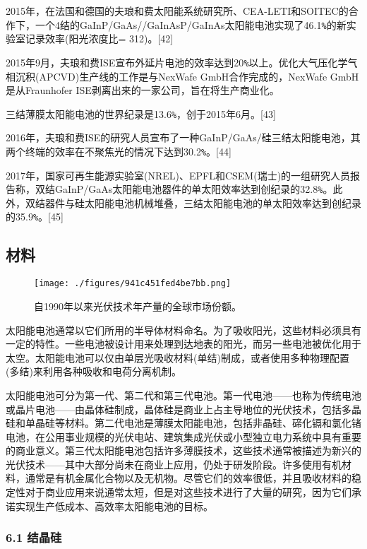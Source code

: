 2015年，在法国和德国的夫琅和费太阳能系统研究所、CEA-LETI和SOITEC的合作下，一个4结的GaInP/GaAs//GaInAsP/GaInAs太阳能电池实现了46.1\verb`%`的新实验室记录效率(阳光浓度比= 312)。[42]

2015年9月，夫琅和费ISE宣布外延片电池的效率达到20\verb`%`以上。优化大气压化学气相沉积(APCVD)生产线的工作是与NexWafe GmbH合作完成的，NexWafe GmbH是从Fraunhofer ISE剥离出来的一家公司，旨在将生产商业化。

三结薄膜太阳能电池的世界纪录是13.6\verb`%`，创于2015年6月。[43]

2016年，夫琅和费ISE的研究人员宣布了一种GaInP/GaAs/硅三结太阳能电池，其两个终端的效率在不聚焦光的情况下达到30.2\verb`%`。[44]

2017年，国家可再生能源实验室(NREL)、EPFL和CSEM(瑞士)的一组研究人员报告称，双结GaInP/GaAs太阳能电池器件的单太阳效率达到创纪录的32.8\verb`%`。此外，双结器件与硅太阳能电池机械堆叠，三结太阳能电池的单太阳效率达到创纪录的35.9\verb`%`。[45]

\subsection{材料}

\begin{figure}[ht]
\centering
\texttt{[image: ./figures/941c451fed4be7bb.png]}
\caption{自1990年以来光伏技术年产量的全球市场份额。} \label{fig_TYNDC_8}
\end{figure}

太阳能电池通常以它们所用的半导体材料命名。为了吸收阳光，这些材料必须具有一定的特性。一些电池被设计用来处理到达地表的阳光，而另一些电池被优化用于太空。太阳能电池可以仅由单层光吸收材料(单结)制成，或者使用多种物理配置(多结)来利用各种吸收和电荷分离机制。

太阳能电池可分为第一代、第二代和第三代电池。第一代电池——也称为传统电池或晶片电池——由晶体硅制成，晶体硅是商业上占主导地位的光伏技术，包括多晶硅和单晶硅等材料。第二代电池是薄膜太阳能电池，包括非晶硅、碲化镉和氯化锗电池，在公用事业规模的光伏电站、建筑集成光伏或小型独立电力系统中具有重要的商业意义。第三代太阳能电池包括许多薄膜技术，这些技术通常被描述为新兴的光伏技术——其中大部分尚未在商业上应用，仍处于研发阶段。许多使用有机材料，通常是有机金属化合物以及无机物。尽管它们的效率很低，并且吸收材料的稳定性对于商业应用来说通常太短，但是对这些技术进行了大量的研究，因为它们承诺实现生产低成本、高效率太阳能电池的目标。

\subsubsection{6.1 结晶硅}

